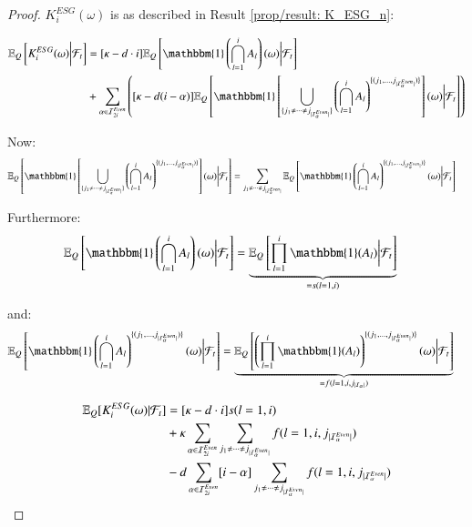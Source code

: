 \begin{proof}

$K_{i}^{ESG}(\omega)$ is as described in Result \ref{prop/result: K_ESG_n}: 

\begin{align*}
\E_{Q}\left[K_{i}^{ESG}(\omega)
\bigg{|}\F_{t}\right]
&= 
[\kappa - d\cdot i]\E_{Q}\left[
\mathbbm{1}\left(
\bigcap_{l=1}^{i}A_{l}
\right)(\omega)\bigg{|}\F_{t}
\right] \\ 
&+
\sum_{\alpha \in \mathcal{I}_{2i}^{Even}}
\left(
[\kappa - d(i-\alpha)]
\E_{Q}\left[
\mathbbm{1}\left[
\bigcup_{\{
j_{1}\neq \dots \neq j_{|\mathcal{I}_{\alpha}^{Even}|}
\}
}
\left(
\bigcap_{l=1}^{i}
A_{l}
\right)
^{
\{
(j_{1}, \dots , j_{|\mathcal{I}_{\alpha}^{Even}|})
\}
}
\right](\omega)
\bigg{|}\F_{t}
\right]
\right)
\end{align*}

Now: 
\begin{align*}
\E_{Q}\left[
\mathbbm{1}\left[
\bigcup_{\{
j_{1}\neq \dots \neq j_{|\mathcal{I}_{\alpha}^{Even}|}
\}
}
\left(
\bigcap_{l=1}^{i}
A_{l}
\right)^{
\{
(j_{1}, \dots , j_{|\mathcal{I}_{\alpha}^{Even}|})
\}
}
\right](\omega)
\bigg{|}\F_{t}
\right]
&= 
\sum_{
j_{1}\neq \dots \neq j_{|\mathcal{I}_{\alpha}^{Even}|}
}
\E_{Q}\left[
\mathbbm{1}\left(
\bigcap_{l=1}^{i}A_{l}
\right)^{
\{
(j_{1}, \dots, j_{|\mathcal{I}_{\alpha}^{Even}|})
\}
}
(\omega)
\bigg{|}\F_{t}
\right]
\end{align*}

Furthermore: 
\begin{align*}
\E_{Q}\left[
\mathbbm{1}\left(
\bigcap_{l=1}^{i}A_{l}
\right)(\omega)\bigg{|}\F_{t}
\right] 
&= \underbrace{
\E_{Q}\left[
\prod_{l=1}^{i}\mathbbm{1}(A_{l})\bigg{|}\F_{t}
\right]
}_{= s(l=1, i)}
\end{align*}

and:
\begin{align*}
\E_{Q}\left[
\mathbbm{1}\left(
\bigcap_{l=1}^{i}A_{l}
\right)^{
\{
(j_{1}, \dots, j_{|\mathcal{I}_{\alpha}^{Even}|})
\}
}(\omega)
\bigg{|}\F_{t}
\right] 
&= \underbrace{
\E_{Q}\left[
\left(
\prod_{l=1}^{i}\mathbbm{1}(A_{l})
\right)^{
\{
(j_{1}, \dots, j_{|\mathcal{I}_{\alpha}^{Even}|})
\}
}
(\omega)
\bigg{|}\F_{t}
\right]
}_{= f(l=1, i, j_{|\mathcal{I}_{\alpha}|})}
\end{align*}

\begin{align*}
\mathbb{E}_{Q}[K_{i}^{ESG}(\omega)|\mathcal{F}_{t}]
&= 
[\kappa -d\cdot i]s(l=1,i) \\
&+ 
\kappa \sum_{\alpha \in \mathcal{I}_{2i}^{Even}}
\sum_{
j_{1}\neq \dots \neq j_{|\mathcal{I}_{\alpha}^{Even}|}
}
f(l=1, i, j_{|\mathcal{I}_{\alpha}^{Even}|}) \\ 
&-
d\sum_{\alpha \in \mathcal{I}_{2i}^{Even}}
[i-\alpha]\sum_{
j_{1}\neq \dots \neq j_{|\mathcal{I}_{\alpha}^{Even}|}
}
f(l=1, i, j_{|\mathcal{I}_{\alpha}^{Even}|})
\end{align*}


\end{proof}
